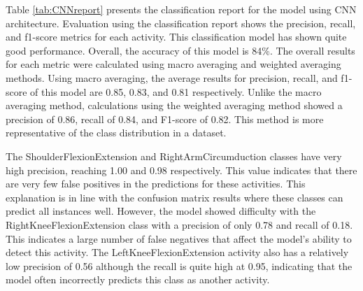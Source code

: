 Table \ref{tab:CNNreport} presents the classification report for the model using CNN architecture. Evaluation using the classification report shows the precision, recall, and f1-score metrics for each activity. This classification model has shown quite good performance. Overall, the accuracy of this model is 84\%. The overall results for each metric were calculated using macro averaging and weighted averaging methods. Using macro averaging, the average results for precision, recall, and f1-score of this model are 0.85, 0.83, and 0.81 respectively. Unlike the macro averaging method, calculations using the weighted averaging method showed a precision of 0.86, recall of 0.84, and F1-score of 0.82. This method is more representative of the class distribution in a dataset.

The ShoulderFlexionExtension and RightArmCircumduction classes have very high precision, reaching 1.00 and 0.98 respectively. This value indicates that there are very few false positives in the predictions for these activities. This explanation is in line with the confusion matrix results where these classes can predict all instances well. However, the model showed difficulty with the RightKneeFlexionExtension class with a precision of only 0.78 and recall of 0.18. This indicates a large number of false negatives that affect the model's ability to detect this activity. The LeftKneeFlexionExtension activity also has a relatively low precision of 0.56 although the recall is quite high at 0.95, indicating that the model often incorrectly predicts this class as another activity.

